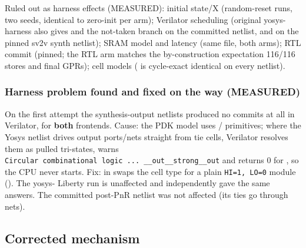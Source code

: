 \begin{record}
Ruled out as harness effects (MEASURED): initial state/X (random-reset
runs, two seeds, identical to zero-init per arm); Verilator scheduling
(original  yosys- harness also gives  and
the not-taken branch on the committed netlist, and  on the
pinned sv2v synth netlist); SRAM model and latency (same file, both
arms); RTL commit (pinned; the RTL arm matches the by-construction
expectation 116/116 stores and final GPRs); cell models (
is cycle-exact identical on every netlist).

\end{record}

\subsubsection{Harness problem found and fixed on the way (MEASURED)}\label{cr:defect:sky130-cpu-synlig-dud4:harness-problem-found-and-fixed-on-the-way-measured}

\begin{record}

On the first attempt the synthesis-output netlists produced no commits
at all in Verilator, for \textbf{both} frontends. Cause: the PDK
 model uses /
primitives; where the Yosys netlist drives output
ports/\allowbreak{}nets straight from tie cells, Verilator resolves them
as pulled tri-states, warns
\texttt{Circular\ combinational\ logic\ .\allowbreak{}.\allowbreak{}.\allowbreak{}\ \_\allowbreak{}\_\allowbreak{}out\_\allowbreak{}\_\allowbreak{}strong\_\allowbreak{}\_\allowbreak{}out}
and returns 0 for , so the CPU never starts. Fix:
 in  swaps the cell type for a plain
\texttt{HI=\allowbreak{}1,\allowbreak{}\ LO=\allowbreak{}0} module
(). The yosys- Liberty run is unaffected
and independently gave the same answers. The committed post-PnR netlist
was not affected (its ties go through  nets).

\end{record}

\subsection{Corrected mechanism}\label{cr:defect:sky130-cpu-synlig-dud4:corrected-mechanism}

